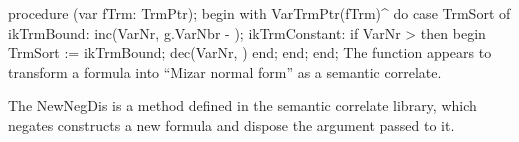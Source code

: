 procedure (var fTrm: TrmPtr);
begin
   with VarTrmPtr(fTrm)^ do
      case TrmSort of
         ikTrmBound:
            inc(VarNr, g.VarNbr - );
         ikTrmConstant:
            if VarNr >  then
            begin
               TrmSort := ikTrmBound;
               dec(VarNr, )
            end;
      end;
end;
\eatline
{}\nwendcode{}\nwdocspar
The {\Tt{}\nwendquote} function appears to transform a formula into ``Mizar
normal form'' as a semantic correlate.

The {\Tt{}NewNegDis\nwendquote} is a method defined in the semantic correlate library,
which negates constructs a new formula and {\Tt{}dispose\nwendquote} the argument
passed to it.

